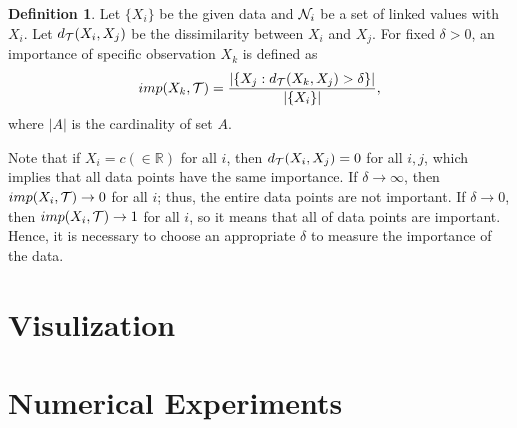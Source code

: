 \documentclass[preprint, review, 12pt]{article}
\theoremstyle{definition}
\newtheorem{dfn}{Definition}
\theoremstyle{remark}
\begin{document}
\begin{dfn}
	Let $\{X_i\}$ be the given data and ${\cal N}_{i}$ be a set of linked values with $X_i$. Let $d_{\cal T}(X_i,X_j)$ be the dissimilarity between $X_i$ and $X_j$. For fixed $\delta>0$, an importance of specific observation $X_{k}$ is defined as 
	\[
	imp(X_{k},{\cal T})=\frac{\left|\{X_{j}:d_{\cal T}(X_{k},X_{j})>\delta\}\right|}{\left|\{X_i\}\right|}, 
	\]
	where $|A|$ is the cardinality of set $A$. 
\end{dfn}

Note that if $X_i=c(\in \mathbb{R})$ for all $i$, then $d_{\cal T}(X_i,X_j)=0$ for all $i,j$, which implies that all data points have the same importance. If $\delta \to \infty$, then $imp(X_i,{\cal T}) \to 0$ for all $i$; thus, the entire data points are not important. If $\delta \to 0$, then $imp(X_i,{\cal T}) \to 1$ for all $i$, so it means that all of data points are important. Hence, it is necessary to choose an  appropriate $\delta$ to measure the importance of the data. 
\fi 
\section{Visulization}

\section{Numerical Experiments}
\iffalse
\end{document}
